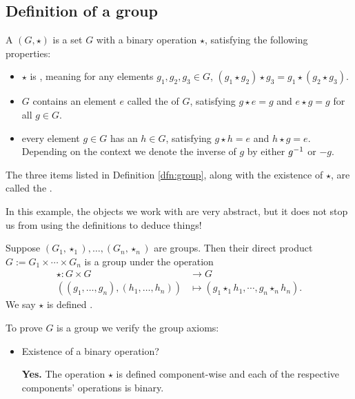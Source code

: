 \documentclass[../UNABRIDGEDalgebraNotesMSRI-UP2016.tex]{subfiles}
\begin{document}
\subsection[\subsecname]{Definition of a group}
\begin{frame}{\subsecname}
\begin{dfn}\label{dfn:group}
A  $(G,\star)$ is a set $G$ with a binary operation $\star$, satisfying the following properties:
\begin{itemize}
\item $\star$ is , meaning for any elements $g_1,g_2,g_3\in G$, $(g_1\star g_2)\star g_3=g_1\star (g_2\star g_3)$.
\item $G$ contains an element $e$ called the  of $G$, satisfying $g\star e=g$ and $e\star g=g$ for all $g\in G$.
\item every element $g\in G$ has an  $h\in G$, satisfying $g\star h=e$ and $h\star g=e$.  Depending on the context we denote the inverse of $g$ by either $g^{-1}$ or $-g$.    
\end{itemize}
\end{dfn}

\smallGap
The three items listed in Definition \ref{dfn:group}, along with the existence of $\star$, are called the .
\end{frame}

\begin{frame}
In this example, the objects we work with are very abstract, but it does not stop us from using the definitions to deduce things!

\smallGap
\begin{ex}
Suppose $(G_1,\star_1),\dots,(G_n,\star_n)$ are groups.  Then their direct product $G:=G_1\times\cdots\times G_n$ is a group under the operation 
\begin{align*}
\star: G\times G &\to G \\
	\left((g_1,\dots,g_n),(h_1,\dots,h_n)\right) &\mapsto
		\left(g_1\star_1 h_1,\cdots, g_n\star_n h_n\right).
\end{align*}
We say $\star$ is defined .  
\end{ex}

\smallGap
To prove $G$ is a group we verify the group axioms:
\begin{itemize}
\item Existence of a binary operation?

\textbf{Yes.}  The operation $\star$ is defined component-wise and each of the respective components' operations is binary.
\end{itemize}
\end{frame}
\end{document}
